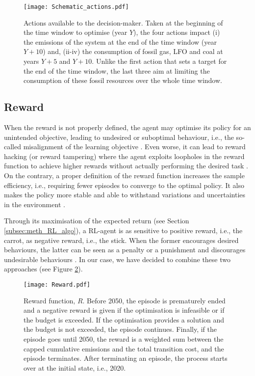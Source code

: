 \documentclass[11pt,twoside,a4paper,english]{article}
\def\ie{i.e., }
\begin{document}
\begin{figure}[!htbp]
\centering
\texttt{[image: Schematic\_actions.pdf]}
\caption{Actions available to the decision-maker. Taken at the beginning of the time window to optimise (year $Y$), the four actions impact (i) the emissions of the system at the end of the time window (year $Y+10$) and, (ii-iv) the consumption of fossil gas, LFO and coal at years $Y+5$ and $Y+10$. Unlike the first action that sets a target for the end of the time window, the last three aim at limiting the consumption of these fossil resources over the whole time window.}
\label{fig:Schematic_actions}
\end{figure} 

\subsection{Reward}
\label{subsec:RL:act_states_rew:rew}

When the reward is not properly defined, the agent may optimise its policy for an unintended objective, leading to undesired or suboptimal behaviour, \ie the so-called misalignment of the learning objective \cite{christiano2017deep}. Even worse, it can lead to reward hacking (or reward tampering) where the agent exploits loopholes in the reward function to achieve higher rewards without actually performing the desired task \cite{amodei2016concrete}. On the contrary, a proper definition of the reward function increases the sample efficiency, \ie requiring fewer episodes to converge to the optimal policy.  It also makes the policy more stable and able to withstand variations and uncertainties in the environment \cite{henderson2018deep}.

Through its maximisation of the expected return (see Section \ref{subsec:meth_RL_algo}), a \gls{RL}-agent is as sensitive to positive reward, \ie the carrot, as negative reward, \ie the stick.  When the former encourages desired behaviours, the latter can be seen as a penalty or a punishment and discourages undesirable behaviours \cite{sutton2018reinforcement}. In our case, we have decided to combine these two approaches (see Figure \ref{fig:Reward}).

\begin{figure}[!htbp]
\centering
\texttt{[image: Reward.pdf]}
\caption{Reward function, $R$. Before 2050, the episode is prematurely ended and a negative reward is given if the optimisation is infeasible or if the  budget is exceeded. If the optimisation provides a solution and the  budget is not exceeded, the episode continues. Finally, if the episode goes until 2050, the reward is a weighted sum between the capped cumulative emissions and the total transition cost, and the episode terminates. After terminating an episode, the process starts over at the initial state, \ie 2020.}
\label{fig:Reward}
\end{figure} 
\end{document}
